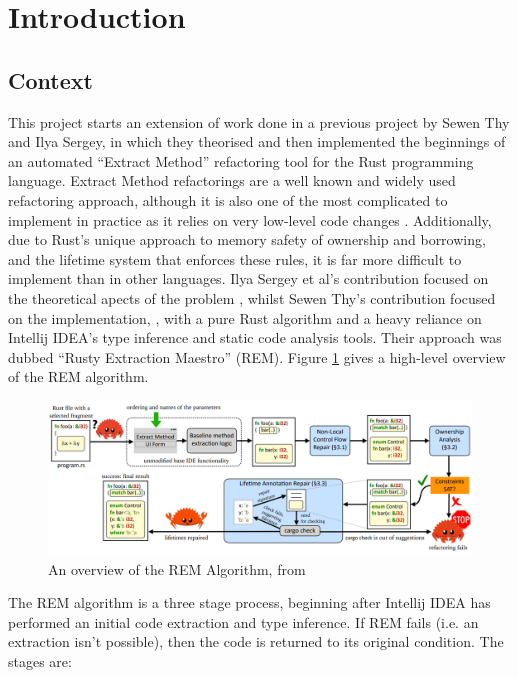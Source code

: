 \section{Introduction}

\subsection*{Context}

This project starts an extension of work done in a previous project by Sewen Thy and
Ilya Sergey, in which they theorised and then implemented the beginnings of an
automated ``Extract Method'' refactoring tool for the Rust programming language.
Extract Method refactorings are a well known and widely used refactoring
approach, although it is also one of the most complicated to implement in practice
as it relies on very low-level code changes \cite{ExtractMethodLitReview}.
Additionally, due to Rust's unique approach to memory safety of
ownership and borrowing, and the lifetime system that enforces these rules, it
is far more difficult to implement than in other languages. Ilya Sergey et al's
contribution focused on the theoretical apects of the problem
\cite{AdventureOfALifetime}, whilst Sewen Thy's contribution focused on the
implementation, \cite{BorrowingWithoutSorrowing}, with a pure Rust algorithm and
a heavy reliance on Intellij IDEA's type inference and static code analysis
tools. Their approach was dubbed ``Rusty Extraction Maestro'' (REM). Figure
\ref{fig:rem-overview} gives a high-level overview
of the REM algorithm.

\begin{figure}[h]
    \centering
    \includegraphics[width=\columnwidth]{Figures/rem-overview.png}
    \caption{An overview of the REM Algorithm, from \cite{AdventureOfALifetime}}
    \label{fig:rem-overview}
\end{figure}

The REM algorithm is a three stage process, beginning after Intellij IDEA has
performed an initial code extraction and type inference. If REM fails (i.e. an
extraction isn't possible), then the code is returned to its original condition.
The stages are:

